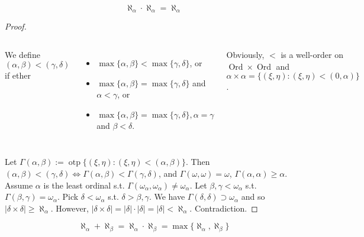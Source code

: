 \documentclass[UTF8,aspectratio=43,11pt,colorlinks,compress,openany]{beamer}%
\begin{document}
\begin{frame}\frametitle{}
\setlength\abovedisplayskip{0pt}
\setlength\belowdisplayskip{0pt}
\begin{theorem}
\[\aleph_\alpha\cdot\aleph_\alpha=\aleph_\alpha\]
\end{theorem}
\begin{proof}
\begin{columns}
We define $(\alpha,\beta)<(\gamma,\delta)$ if ether
\begin{itemize}
	\item $\max\{\alpha,\beta\}<\max\{\gamma,\delta\}$, or
	\item $\max\{\alpha,\beta\}=\max\{\gamma,\delta\}$ and $\alpha<\gamma$, or
	\item $\max\{\alpha,\beta\}=\max\{\gamma,\delta\}, \alpha=\gamma$ and $\beta<\delta$.
\end{itemize}
Obviously, $<$ is a well-order on $\operatorname{Ord}\times\operatorname{Ord}$ and $\alpha\times\alpha=\big\{(\xi,\eta):(\xi,\eta)<(0,\alpha)\big\}$.
\begin{center}
\end{center}
\end{columns}
Let $\Gamma(\alpha,\beta):=\operatorname{otp}\big\{(\xi,\eta):(\xi,\eta)<(\alpha,\beta)\big\}$. Then $(\alpha,\beta)<(\gamma,\delta)\iff\Gamma(\alpha,\beta)<\Gamma(\gamma,\delta)$, and $\Gamma(\omega,\omega)=\omega$, $\Gamma(\alpha,\alpha)\geq\alpha$.\\
Assume $\alpha$ is the least ordinal s.t. $\Gamma(\omega_\alpha,\omega_\alpha)\ne \omega_\alpha$. Let $\beta,\gamma<\omega_\alpha$ s.t. $\Gamma(\beta,\gamma)=\omega_\alpha$. Pick $\delta<\omega_\alpha$ s.t. $\delta>\beta,\gamma$. We have $\Gamma(\delta,\delta)\supset\omega_\alpha$ and so $|\delta\times\delta|\geq\aleph_\alpha$. However, $|\delta\times\delta|=|\delta|\cdot|\delta|=|\delta|<\aleph_\alpha$. Contradiction.
\end{proof}
\[\aleph_\alpha+\aleph_\beta=\aleph_\alpha\cdot\aleph_\beta=\max\{\aleph_\alpha,\aleph_\beta\}\]
\end{frame}
\end{document}
